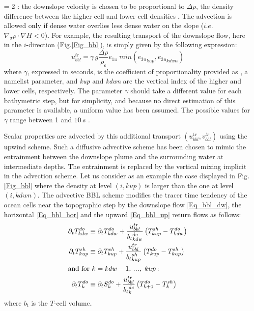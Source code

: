 \documentclass[NEMO_book]{subfiles}
\begin{document}
 = 2 : the downslope velocity is chosen to be proportional to $\Delta \rho$,
the density difference between the higher cell and lower cell densities \citep{Campin_Goosse_Tel99}.
The advection is allowed only  if dense water overlies less dense water on the slope ($i.e.$ 
$\nabla_\sigma \rho  \cdot  \nabla H<0$). For example, the resulting transport of the 
downslope flow, here in the $i$-direction (Fig.\ref{Fig_bbl}), is simply given by the 
following expression:
\begin{equation} \label{Eq_bbl_Utr}
 u^{tr}_{bbl} = \gamma \, g \frac{\Delta \rho}{\rho_o}  e_{1u} \; min \left( {e_{3u}}_{kup},{e_{3u}}_{kdwn} \right)
\end{equation}
where $\gamma$, expressed in seconds, is the coefficient of proportionality 
provided as , a namelist parameter, and \textit{kup} and \textit{kdwn} 
are the vertical index of the higher and lower cells, respectively.
The parameter $\gamma$ should take a different value for each bathymetric 
step, but for simplicity, and because no direct estimation of this parameter is 
available, a uniform value has been assumed. The possible values for $\gamma$ 
range between 1 and $10~s$ \citep{Campin_Goosse_Tel99}.  

Scalar properties are advected by this additional transport $( u^{tr}_{bbl}, v^{tr}_{bbl} )$ 
using the upwind scheme. Such a diffusive advective scheme has been chosen 
to mimic the entrainment between the downslope plume and the surrounding 
water at intermediate depths. The entrainment is replaced by the vertical mixing 
implicit in the advection scheme. Let us consider as an example the 
case displayed in Fig.\ref{Fig_bbl} where the density at level $(i,kup)$ is 
larger than the one at level $(i,kdwn)$. The advective BBL scheme
modifies the tracer time tendency of the ocean cells near the 
topographic step by the downslope flow \eqref{Eq_bbl_dw}, 
the horizontal \eqref{Eq_bbl_hor}  and the upward \eqref{Eq_bbl_up} 
return flows as follows: 
\begin{align} 
\partial_t T^{do}_{kdw} &\equiv \partial_t T^{do}_{kdw}
                                     +  \frac{u^{tr}_{bbl}}{{b_t}^{do}_{kdw}}  \left( T^{sh}_{kup} - T^{do}_{kdw} \right)  \label{Eq_bbl_dw} \\
%
\partial_t T^{sh}_{kup} &\equiv \partial_t T^{sh}_{kup} 
				   + \frac{u^{tr}_{bbl}}{{b_t}^{sh}_{kup}}   \left( T^{do}_{kup} - T^{sh}_{kup} \right)   \label{Eq_bbl_hor} \\
%
\intertext{and for $k =kdw-1,\;..., \; kup$ :} 
%
\partial_t T^{do}_{k} &\equiv \partial_t S^{do}_{k}
				   + \frac{u^{tr}_{bbl}}{{b_t}^{do}_{k}}   \left( T^{do}_{k+1} - T^{sh}_{k} \right)   \label{Eq_bbl_up}
\end{align}
where $b_t$ is the $T$-cell volume. 
\end{document}
